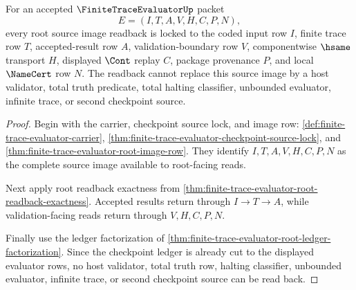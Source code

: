 \begin{theorem}
\label{thm:finitetrace-evaluator-root-source-image-readback-lock}
For an accepted $\FiniteTraceEvaluatorUp$ packet
$$
E=(I,T,A,V,H,C,P,N),
$$
every root source image readback is locked to the coded input row $I$, finite trace row $T$, accepted-result row $A$, validation-boundary row $V$, componentwise $\hsame$ transport $H$, displayed $\Cont$ replay $C$, package provenance $P$, and local $\NameCert$ row $N$. The readback cannot replace this source image by a host validator, total truth predicate, total halting classifier, unbounded evaluator, infinite trace, or second checkpoint source.
\end{theorem}
\begin{proof}
Begin with the carrier, checkpoint source lock, and image row: \autoref{def:finite-trace-evaluator-carrier}, \autoref{thm:finite-trace-evaluator-checkpoint-source-lock}, and \autoref{thm:finite-trace-evaluator-root-image-row}. They identify $I,T,A,V,H,C,P,N$ as the complete source image available to root-facing reads.

Next apply root readback exactness from \autoref{thm:finite-trace-evaluator-root-readback-exactness}. Accepted results return through $I \to T \to A$, while validation-facing reads return through $V,H,C,P,N$.

Finally use the ledger factorization of \autoref{thm:finite-trace-evaluator-root-ledger-factorization}. Since the checkpoint ledger is already cut to the displayed evaluator rows, no host validator, total truth row, halting classifier, unbounded evaluator, infinite trace, or second checkpoint source can be read back.
\end{proof}

